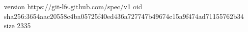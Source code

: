version https://git-lfs.github.com/spec/v1
oid sha256:3654aac20558c4ba05725f40ed436a727747b49674c15a9f474ad71155762b34
size 2335

